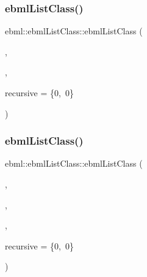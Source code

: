 \mbox{\label{classebml_1_1ebmlListClass_a18f17432c67895e3d89b04a65ed5733a}} 
\subsubsection{\texorpdfstring{ebml\+List\+Class()}{ebmlListClass()}\hspace{0.1cm}{\footnotesize\ttfamily [4/6]}}
{\footnotesize\ttfamily ebml\+::ebml\+List\+Class\+::ebml\+List\+Class (\begin{DoxyParamCaption}\item[{\mbox{\hyperlink{namespaceebml_a86c5f604ddf12a74aa9812e997a58691}{ebml\+I\+D\+\_\+t}}}]{,  }\item[{std\+::wstring}]{,  }\item[{const \mbox{\hyperlink{structebml_1_1occurSpec__t}{occur\+Spec\+\_\+t}} \&}]{recursive = {\ttfamily \{0,~0\}} }\end{DoxyParamCaption})}

\mbox{\label{classebml_1_1ebmlListClass_a373906bae3c82a6c05f848822abd8e36}} 
\subsubsection{\texorpdfstring{ebml\+List\+Class()}{ebmlListClass()}\hspace{0.1cm}{\footnotesize\ttfamily [5/6]}}
{\footnotesize\ttfamily ebml\+::ebml\+List\+Class\+::ebml\+List\+Class (\begin{DoxyParamCaption}\item[{\mbox{\hyperlink{namespaceebml_a86c5f604ddf12a74aa9812e997a58691}{ebml\+I\+D\+\_\+t}}}]{,  }\item[{std\+::wstring}]{,  }\item[{const \mbox{\hyperlink{namespaceebml_abf07998998c284c9be3f76b5d9e192e1}{child\+Class\+Spec\+Arg\+\_\+l}} \&}]{,  }\item[{const \mbox{\hyperlink{structebml_1_1occurSpec__t}{occur\+Spec\+\_\+t}} \&}]{recursive = {\ttfamily \{0,~0\}} }\end{DoxyParamCaption})}

